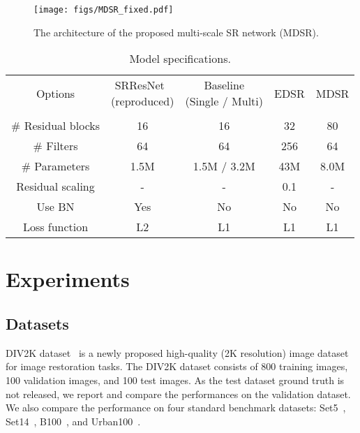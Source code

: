 \documentclass[10pt,twocolumn,letterpaper]{article}
\begin{document}
\begin{figure}[t]
		\begin{center}
			\texttt{[image: figs/MDSR\_fixed.pdf]}
		\end{center}
\captionsetup{justification=raggedright,singlelinecheck=false}
		\caption{The architecture of the proposed multi-scale SR network (MDSR).}
		\label{fig_model_multi}
	\end{figure}
	
\begin{table}[t]
		{\footnotesize
			\renewcommand{\arraystretch}{1.3}
			\setlength{\tabcolsep}{2pt}
			\begin{center}
				\begin{tabular}{ c | c c c c }
					\\ [-1em]
					Options 
					& \parbox[c]{2cm} {\centering SRResNet~\cite{ledig2016photo} \\(reproduced)}
					& \parbox[c]{2cm} {\centering Baseline \\ (Single / Multi)}
					& EDSR
					& MDSR\\ \\ [-1em]\hline
					$\#$ Residual blocks & 16 & 16 & 32 & 80\\ $\#$ Filters & 64 & 64 & 256 & 64\\ $\#$ Parameters & 1.5M & 1.5M / 3.2M & 43M & 8.0M\\ Residual scaling & - & - & 0.1 & -\\ Use BN & Yes & No & No & No\\
					Loss function & L2 & L1 & L1 & L1\\ \end{tabular}
			\end{center}
		}
		\caption{Model specifications.}
		\label{table_models}
	\end{table}
	
	\section{Experiments}
	\label{sec_experiments}
	
	\subsection{Datasets}
	
	DIV2K dataset~\cite{Timofte_2017_CVPR_Workshops} is a newly proposed high-quality (2K resolution) image dataset for image restoration tasks. 
	The DIV2K dataset consists of 800 training images, 100 validation images, and 100 test images.
	As the test dataset ground truth is not released, we report and compare the performances on the validation dataset.
We also compare the performance on four standard benchmark datasets: Set5~\cite{bevilacqua2012low}, Set14~\cite{zeyde2010single}, B100~\cite{martin2001database}, and Urban100~\cite{huang2015single}.
	
\end{document}
